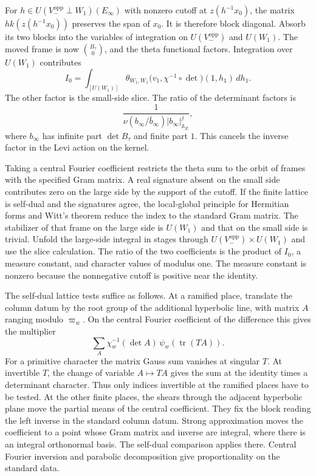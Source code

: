 For \(h\in U(V_-^{\mathrm{opp}}\perp W_1)(E_\infty)\) with nonzero cutoff at
\(z(h^{-1}x_0)\), the matrix \(h k(z(h^{-1}x_0))\) preserves the span of \(x_0\).
It is therefore block diagonal. Absorb its two blocks into the variables
of integration on \(U(V_-^{\mathrm{opp}})\) and \(U(W_1)\).
The moved frame is now \(\binom{B_\tau}{0}\), and the theta functional
factors. Integration over \(U(W_1)\) contributes
\[
 I_0=\int_{[U(W_1)]}
    \theta_{W_1,W_1}\bigl(v_1,\chi^{-1}\circ\det\bigr)(1,h_1)\,dh_1 .
\]
The other factor is the small-side slice. The ratio of the determinant
factors is
\[
 \frac{1}{\nu(b_\infty/\bar b_\infty)|b_\infty|_{\mathbb A_E}^{j}},
\]
where \(b_\infty\) has infinite part \(\det B_\tau\) and finite part \(1\).
This cancels the inverse factor in the Levi action on the kernel.

Taking a central Fourier coefficient restricts the theta sum to the orbit
of frames with the specified Gram matrix. A real signature absent on the
small side contributes zero on the large side by the support of the cutoff.
If the finite lattice is self-dual and the signatures agree, the local-global
principle for Hermitian forms and Witt's theorem reduce the index to the
standard Gram matrix. The stabilizer of that frame on the large side is
\(U(W_1)\) and that on the small side is trivial. Unfold the large-side
integral in stages through \(U(V_-^{\mathrm{opp}})\times U(W_1)\) and use the
slice calculation. The ratio of the two coefficients is the product of
\(I_0\), a measure constant, and character values of modulus one.
The measure constant is nonzero because the nonnegative cutoff is positive
near the identity.

The self-dual lattice tests suffice as follows. At a ramified place, translate
the column datum by the root group of the additional hyperbolic line, with
matrix \(A\) ranging modulo \(\varpi_w\). On the central Fourier coefficient
of the difference this gives the multiplier
\[
 \sum_{A}\chi_w^{-1}(\det A)\,\psi_w(\operatorname{tr}(TA)).
\]
For a primitive character the matrix Gauss sum vanishes at singular \(T\).
At invertible \(T\), the change of variable \(A\mapsto TA\) gives the sum
at the identity times a determinant character. Thus only indices invertible
at the ramified places have to be tested. At the other finite places, the
shears through the adjacent hyperbolic plane move the partial means of the
central coefficient. They fix the block reading the left inverse in the
standard column datum. Strong approximation moves the coefficient to a
point whose Gram matrix and inverse are integral, where there is an integral
orthonormal basis. The self-dual comparison applies there. Central Fourier
inversion and parabolic decomposition give proportionality on the standard data.

